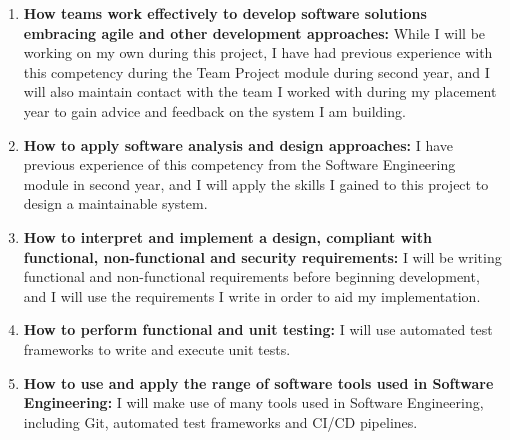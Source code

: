 \documentclass[12pt]{article}
\begin{document}
\begin{enumerate}
		\item \textbf{How teams work effectively to develop software solutions embracing agile and other development approaches:} While I will be working on my own during this project, I have had previous experience with this competency during the Team Project module during second year, and I will also maintain contact with the team I worked with during my placement year to gain advice and feedback on the system I am building.
		\item \textbf{How to apply software analysis and design approaches:} I have previous experience of this competency from the Software Engineering module in second year, and I will apply the skills I gained to this project to design a maintainable system.
		\item \textbf{How to interpret and implement a design, compliant with functional, non-functional and security requirements:} I will be writing functional and non-functional requirements before beginning development, and I will use the requirements I write in order to aid my implementation.
		\item \textbf{How to perform functional and unit testing:} I will use automated test frameworks to write and execute unit tests.
		\item \textbf{How to use and apply the range of software tools used in Software Engineering:} I will make use of many tools used in Software Engineering, including Git, automated test frameworks and CI/CD pipelines.
	\end{enumerate}

	\pagebreak
	
	\appendix
	
	
\end{document}
